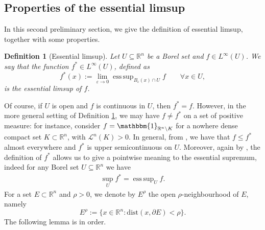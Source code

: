 \documentclass[a4paper,11pt]{article}
\numberwithin{equation}{section}
\newtheorem{Definition}[Theorem]{Definition}
\newcommand{\numberset}{\mathbb}
\newcommand{\eps}{\varepsilon}
\newcommand{\R}{\numberset{R}}
\DeclareMathOperator*{\esssup}{ess\,sup}
\theoremstyle{definition}
\begin{document}
\subsection{Properties of the essential limsup}
In this second preliminary section, we give the definition of essential limsup, together with some properties.

\begin{Definition}[Essential limsup]\label{ess limsup}
Let $U\subseteq\R^n$ be a Borel set and $f\in L^\infty(U)$. We say that the function $f^*\in L^\infty(U)$, defined as
$$
f^*(x):=\lim_{\eps\to0}\esssup_{B_\eps(x)\cap U}f\qquad\forall x\in U,
$$
is the essential limsup of $f$.
\end{Definition}
Of course, if $U$ is open and $f$ is continuous in $U$, then $f^*=f$. 
However, in the more general setting of Definition \ref{ess limsup}, we may have $f\neq f^*$ on a set of positive measure: for instance, consider $f=\mathbbm{1}_{\R^n\setminus K}$ for a nowhere dense compact set $K\subset\R^n$, with $\mathscr L^n(K)>0$. In general, from \cite[Proposition 9]{KSIAM}, we have that $f\leq f^*$ almost everywhere and $f^*$ is upper semicontinuous on $U$. Moreover, again by \cite[Proposition 9]{KSIAM}, the definition of $f^*$ allows us to give a pointwise meaning to the essential supremum, indeed for any Borel set $U\subseteq\R^n$ we have
\begin{align}\label{pointwise sup}
\sup_U f^*=\esssup_U f.
\end{align}
For a set $E\subset\R^n$ and $\rho>0$, we denote by $E^\rho$ the open $\rho$-neighbourhood of $E$, namely $$E^\rho:=\{x\in\R^n: \mathrm{dist}(x,\partial E)<\rho\}.$$
The following lemma is in order.
\end{document}
